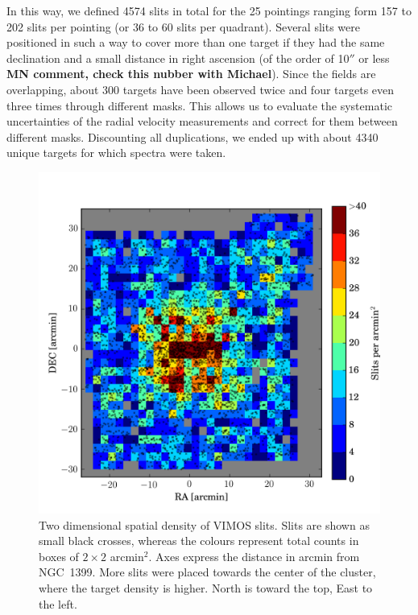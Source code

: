 \documentclass[useAMS,usenatbib]{mn2e}
\begin{document}
In this way, we defined 4574 slits in total for the 25 pointings ranging form 157 to 202 slits per pointing (or 36 to 60 slits per quadrant). Several slits were positioned in such a way to cover more than one target if they had the same declination and a small distance in right ascension (of the order of 10$''$ or less {\bf MN comment, check this nubber with Michael}). Since the fields are overlapping, about 300 targets have been observed twice and four targets even three times through different masks. This allows us to evaluate the systematic uncertainties of the radial velocity measurements and correct for them between different masks. Discounting all duplications, we ended up with about 4340 unique targets
for which spectra were taken. 


\begin{figure}
\centering
\includegraphics[width=\columnwidth]{figures/slitdist.png} 
\caption{Two dimensional spatial density of VIMOS slits. Slits are shown as small black crosses, whereas the colours represent total counts in boxes of $2\times2$ arcmin$^2$. Axes express the distance in arcmin from NGC~1399. More slits were placed towards the center of the cluster, where the target density is higher. North is toward the top, East to the left.}
\label{fig:2dsplit}
\end{figure}
\end{document}
